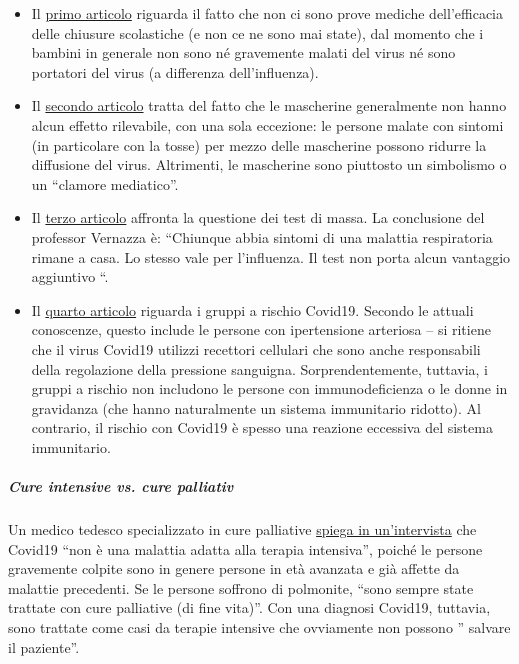 \begin{itemize}
\tightlist
\item
  Il
  \href{https://infekt.ch/2020/04/schulen-schliessen-hilfreich-oder-nicht/}{primo
  articolo} riguarda il fatto che non ci sono prove mediche
  dell'efficacia delle chiusure scolastiche (e non ce ne sono mai
  state), dal momento che i bambini in generale non sono né gravemente
  malati del virus né sono portatori del virus (a differenza
  dell'influenza).
\item
  Il
  \href{https://infekt.ch/2020/04/atemschutzmasken-fuer-alle-medienhype-oder-unverzichtbar/}{secondo
  articolo} tratta del fatto che le mascherine generalmente non hanno
  alcun effetto rilevabile, con una sola eccezione: le persone malate
  con sintomi (in particolare con la tosse) per mezzo delle mascherine
  possono ridurre la diffusione del virus. Altrimenti, le mascherine
  sono piuttosto un simbolismo o un ``clamore mediatico''.\\
\item
  Il
  \href{https://infekt.ch/2020/04/corona-testen-testen-und-kein-ende/}{terzo
  articolo} affronta la questione dei test di massa. La conclusione del
  professor Vernazza è: ``Chiunque abbia sintomi di una malattia
  respiratoria rimane a casa. Lo stesso vale per l'influenza. Il test
  non porta alcun vantaggio aggiuntivo ``.
\item
  Il
  \href{https://infekt.ch/2020/03/immunschwaeche-und-schwangerschaft-kein-covid-19-risikofaktor/}{quarto
  articolo} riguarda i gruppi a rischio Covid19. Secondo le attuali
  conoscenze, questo include le persone con ipertensione arteriosa -- si
  ritiene che il virus Covid19 utilizzi recettori cellulari che sono
  anche responsabili della regolazione della pressione sanguigna.
  Sorprendentemente, tuttavia, i gruppi a rischio non includono le
  persone con immunodeficienza o le donne in gravidanza (che hanno
  naturalmente un sistema immunitario ridotto). Al contrario, il rischio
  con Covid19 è spesso una reazione eccessiva del sistema immunitario.
\end{itemize}

\hypertarget{cure-intensive-vs-cure-palliativ}{%
\subparagraph{\texorpdfstring{\textbf{Cure intensive vs. cure
palliativ}}{Cure intensive vs. cure palliativ}}\label{cure-intensive-vs-cure-palliativ}}

 Un medico tedesco specializzato in cure palliative
\href{https://www.ruhr24.de/ruhrgebiet/coronavirus-behandlung-intensivstation-nrw-lungenentzuendung-matthias-thoens-witten-zr-13645038.html}{spiega
in un'intervista} che Covid19 ``non è una malattia adatta alla terapia
intensiva'', poiché le persone gravemente colpite sono in genere persone
in età avanzata e già affette da malattie precedenti. Se le persone
soffrono di polmonite, ``sono sempre state trattate con cure palliative
(di fine vita)''. Con una diagnosi Covid19, tuttavia, sono trattate come
casi da terapie intensive che ovviamente non possono '' salvare il
paziente''.

